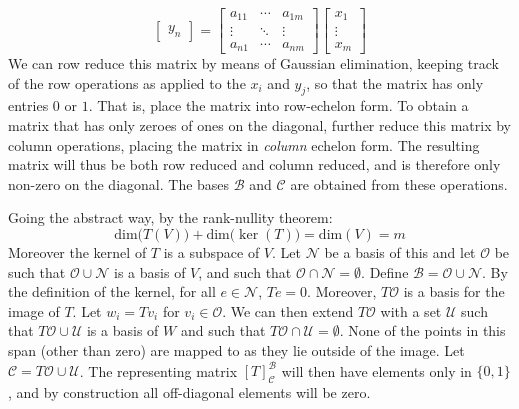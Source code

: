 \documentclass[crop=false,class=article]{standalone}                       %
\begin{document}
\begin{solution}
\begin{equation}
\begin{bmatrix}
                    y_{n}
                \end{bmatrix}=
                \begin{bmatrix}
                    a_{11}&\cdots&a_{1m}\\
                    \vdots&\ddots&\vdots\\
                    a_{n1}&\cdots&a_{nm}
                \end{bmatrix}
                \begin{bmatrix}
                    x_{1}\\
                    \vdots\\
                    x_{m}
                \end{bmatrix}
            \end{equation}
            We can row reduce this matrix by means of Gaussian elimination,
            keeping track of the row operations as applied to the $x_{i}$
            and $y_{j}$, so that the matrix has only entries $0$ or $1$.
            That is, place the matrix into row-echelon form. To obtain a
            matrix that has only zeroes of ones on the diagonal, further
            reduce this matrix by column operations, placing the matrix
            in \textit{column} echelon form. The resulting matrix will thus
            be both row reduced and column reduced, and is therefore only
            non-zero on the diagonal. The bases $\mathscr{B}$ and
            $\mathscr{C}$ are obtained from these operations.
            \par\hfill\par
            Going the abstract way, by the rank-nullity theorem:
            \begin{equation}
                \textrm{dim}\big(T(V)\big)+
                \textrm{dim}\big(\ker(T)\big)=
                \textrm{dim}(V)=m
            \end{equation}
            Moreover the kernel of $T$ is a subspace of $V$. Let
            $\mathcal{N}$ be a basis of this and let $\mathcal{O}$ be such
            that $\mathcal{O}\cup\mathcal{N}$ is a basis of $V$, and such
            that $\mathcal{O}\cap\mathcal{N}=\emptyset$.
            Define $\mathscr{B}=\mathcal{O}\cup\mathcal{N}$. By the
            definition of the kernel, for all $e\in\mathcal{N}$, $Te=0$.
            Moreover, $T\mathcal{O}$ is a basis for the image of $T$.
            Let $w_{i}=Tv_{i}$ for $v_{i}\in\mathcal{O}$. We can then
            extend $T\mathcal{O}$ with a set $\mathcal{U}$ such that
            $T\mathcal{O}\cup\mathcal{U}$ is a basis of $W$ and such that
            $T\mathcal{O}\cap\mathcal{U}=\emptyset$. None of the
            points in this span (other than zero) are mapped to as they lie
            outside of the image. Let
            $\mathscr{C}=T\mathcal{O}\cup\mathcal{U}$.
            The representing matrix $[T]_{\mathscr{C}}^{\mathscr{B}}$ will
            then have elements only in $\{0,1\}$, and by construction all
            off-diagonal elements will be zero.
        \end{solution}
\end{document}
